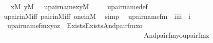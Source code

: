 \begin{isabellebody}
\ \ {\isachardoublequoteopen}{\isasymlbrakk}\ x{\isasymin}M{\isacharsemicolon}{\kern0pt}\ y{\isasymin}M\ {\isasymrbrakk}\ {\isasymLongrightarrow}\ upair{\isacharunderscore}{\kern0pt}name{\isacharparenleft}{\kern0pt}x{\isacharcomma}{\kern0pt}y{\isacharparenright}{\kern0pt}{\isasymin}M{\isachardoublequoteclose}\ \isanewline
%
\isadelimproof
\ \ %
\endisadelimproof
%
\isatagproof
{}\isamarkupfalse%
\ upair{\isacharunderscore}{\kern0pt}name{\isacharunderscore}{\kern0pt}def\ \isamarkupfalse%
\ upair{\isacharunderscore}{\kern0pt}in{\isacharunderscore}{\kern0pt}M{\isacharunderscore}{\kern0pt}iff\ pair{\isacharunderscore}{\kern0pt}in{\isacharunderscore}{\kern0pt}M{\isacharunderscore}{\kern0pt}iff\ one{\isacharunderscore}{\kern0pt}in{\isacharunderscore}{\kern0pt}M\ \isamarkupfalse%
\ simp%
\endisatagproof
{\isafoldproof}%
%
\isadelimproof
\isanewline
%
\endisadelimproof
\isanewline
{}\isamarkupfalse%
\isanewline
\ \ upair{\isacharunderscore}{\kern0pt}name{\isacharunderscore}{\kern0pt}fm\ {\isacharcolon}{\kern0pt}{\isacharcolon}{\kern0pt}\ {\isachardoublequoteopen}{\isacharbrackleft}{\kern0pt}i{\isacharcomma}{\kern0pt}i{\isacharcomma}{\kern0pt}i{\isacharcomma}{\kern0pt}i{\isacharbrackright}{\kern0pt}\ {\isasymRightarrow}\ i{\isachardoublequoteclose}\ \isanewline
\ \ {\isachardoublequoteopen}upair{\isacharunderscore}{\kern0pt}name{\isacharunderscore}{\kern0pt}fm{\isacharparenleft}{\kern0pt}x{\isacharcomma}{\kern0pt}y{\isacharcomma}{\kern0pt}o{\isacharcomma}{\kern0pt}z{\isacharparenright}{\kern0pt}\ {\isasymequiv}\ Exists{\isacharparenleft}{\kern0pt}Exists{\isacharparenleft}{\kern0pt}And{\isacharparenleft}{\kern0pt}pair{\isacharunderscore}{\kern0pt}fm{\isacharparenleft}{\kern0pt}x{\isacharhash}{\kern0pt}{\isacharplus}{\kern0pt}{}{\isacharcomma}{\kern0pt}o{\isacharhash}{\kern0pt}{\isacharplus}{\kern0pt}{}{\isacharcomma}{\kern0pt}{}{\isacharparenright}{\kern0pt}{\isacharcomma}{\kern0pt}\isanewline
\ \ \ \ \ \ \ \ \ \ \ \ \ \ \ \ \ \ \ \ \ \ \ \ \ \ \ \ \ \ \ \ \ \ \ \ \ \ \ \ \ \ And{\isacharparenleft}{\kern0pt}pair{\isacharunderscore}{\kern0pt}fm{\isacharparenleft}{\kern0pt}y{\isacharhash}{\kern0pt}{\isacharplus}{\kern0pt}{}{\isacharcomma}{\kern0pt}o{\isacharhash}{\kern0pt}{\isacharplus}{\kern0pt}{}{\isacharcomma}{\kern0pt}{}{\isacharparenright}{\kern0pt}{\isacharcomma}{\kern0pt}upair{\isacharunderscore}{\kern0pt}fm{\isacharparenleft}{\kern0pt}{}{\isacharcomma}{\kern0pt}{}{\isacharcomma}{\kern0pt}z{\isacharhash}{\kern0pt}{\isacharplus}{\kern0pt}{}{\isacharparenright}{\kern0pt}{\isacharparenright}{\kern0pt}{\isacharparenright}{\kern0pt}{\isacharparenright}{\kern0pt}{\isacharparenright}{\kern0pt}{\isachardoublequoteclose}\ \isanewline

\end{isabellebody}
